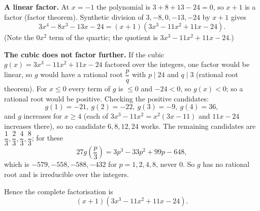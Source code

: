 \textbf{A linear factor.} At $x=-1$ the polynomial is $3+8+13-24=0$, so $x+1$ is a factor (factor theorem). Synthetic division of $3,-8,0,-13,-24$ by $x+1$ gives
\[
3x^4-8x^3-13x-24=(x+1)\left(3x^3-11x^2+11x-24\right).
\]
(Note the $0x^2$ term of the quartic; the quotient is $3x^3-11x^2+11x-24$.)

\textbf{The cubic does not factor further.} If the cubic $g(x)=3x^3-11x^2+11x-24$ factored over the integers, one factor would be linear, so $g$ would have a rational root $\dfrac {p}{q}$ with $p\mid24$ and $q\mid3$ (rational root theorem). For $x\le0$ every term of $g$ is $\le0$ and $-24<0$, so $g(x)<0$; so a rational root would be positive. Checking the positive candidates:
\[
g(1)=-21,\ g(2)=-22,\ g(3)=-9,\ g(4)=36,
\]
and $g$ increases for $x\ge4$ (each of $3x^3-11x^2=x^2(3x-11)$ and $11x-24$ increases there), so no candidate $6,8,12,24$ works. The remaining candidates are $\dfrac{1}{3},\dfrac{2}{3},\dfrac{4}{3},\dfrac{8}{3}$; for these
\[
27g\!\left(\dfrac {p}{3}\right)=3p^3-33p^2+99p-648,
\]
which is $-579,-558,-588,-432$ for $p=1,2,4,8$, never $0$. So $g$ has no rational root and is irreducible over the integers.

Hence the complete factorisation is
\[
\boxed{(x+1)\left(3x^3-11x^2+11x-24\right)}.
\]
